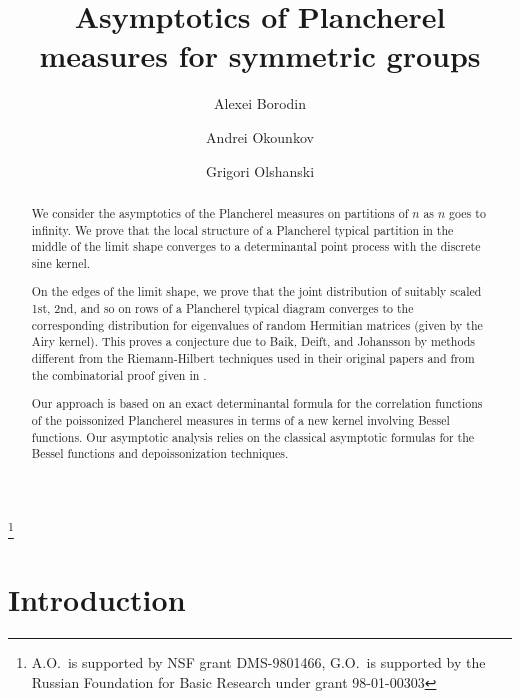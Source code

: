 \documentclass[12pt]{amsart}
\theoremstyle{plain}
\theoremstyle{definition}
\numberwithin{equation}{section}
\begin{document}
\title[Asymptotics of Plancherel Measures]
{Asymptotics of Plancherel measures for symmetric groups} 
\author[A.~Borodin]{Alexei Borodin}
\address{University of Pennsylvania, Department of Mathematics,
Philadelphia PA 19104--6395 }
\author[A.~Okounkov]{Andrei Okounkov}
\address{University of Chicago, Department of Mathematics,
5734 University Ave., Chicago IL 60637}
\author[G.~Olshanski]{Grigori Olshanski}
\address{Dobrushin Mathematics Laboratory,
Institute for Problems of Information Transmission, Bolshoy Karetny 19,
101447, Moscow, Russia}
\thanks{A.O.\ is supported by NSF grant DMS-9801466, G.O.\ is supported by the Russian      
Foundation for Basic Research under grant 98-01-00303}
\begin{abstract}
We consider the asymptotics of the Plancherel measures
on partitions of $n$ as $n$ goes to infinity. We prove
that the local structure of a Plancherel typical partition
in the middle of the limit shape converges to a determinantal
point process with the discrete sine kernel. 

On the edges
of the limit shape, we prove that the joint distribution
of suitably scaled 1st, 2nd, and so on rows of a Plancherel
typical diagram converges to the corresponding distribution for
eigenvalues of random Hermitian matrices (given by the Airy
kernel). This
proves a conjecture due to Baik, Deift, and Johansson by
methods different from the Riemann-Hilbert techniques used in their
original
papers \cite{BDJ1,BDJ2} and from the combinatorial
proof given in \cite{O}.
 
Our approach is based on an exact determinantal
formula  for the correlation functions of the
poissonized Plancherel measures in terms of a new 
kernel involving Bessel functions.  Our
asymptotic analysis relies on the
classical asymptotic formulas for the Bessel functions and
depoissonization techniques.
\end{abstract}


\maketitle 

\section{Introduction}\label{s1}
\end{document}
